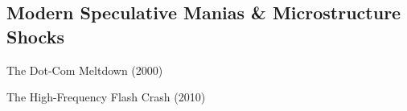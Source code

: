 \documentclass[10pt]{article}
\begin{document}
  \subsection{Modern Speculative Manias \& Microstructure Shocks}

    \begin{core}{The Dot-Com Meltdown (2000)}


    \end{core}

    \begin{core}{The High-Frequency Flash Crash (2010)}


    \end{core}
\end{document}
